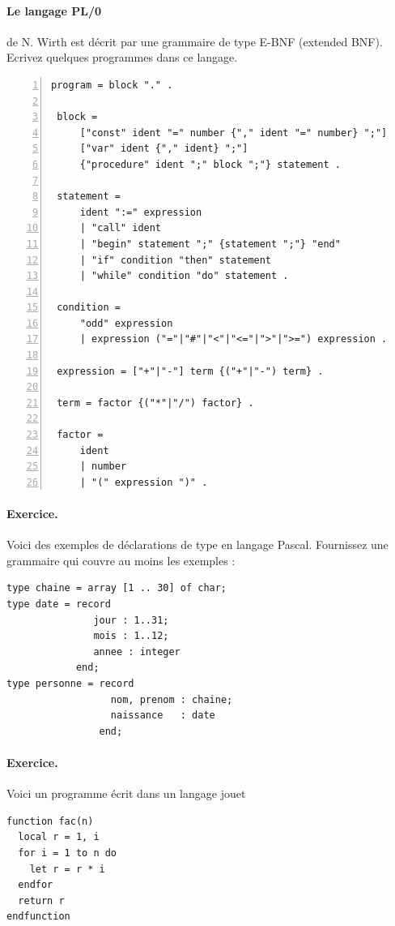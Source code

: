 \documentclass[twoside,11pt]{article}
\begin{document}
\paragraph{Le langage PL/0} de N. Wirth est décrit par une grammaire
de type E-BNF (extended BNF). Ecrivez quelques programmes dans ce langage.
{\small
\begin{lstlisting}[frame=single,numbers=left]
 program = block "." .
 
 block =
     ["const" ident "=" number {"," ident "=" number} ";"]
     ["var" ident {"," ident} ";"]
     {"procedure" ident ";" block ";"} statement .
 
 statement =
     ident ":=" expression
     | "call" ident
     | "begin" statement ";" {statement ";"} "end"
     | "if" condition "then" statement
     | "while" condition "do" statement .
 
 condition =
     "odd" expression
     | expression ("="|"#"|"<"|"<="|">"|">=") expression .
 
 expression = ["+"|"-"] term {("+"|"-") term} .
 
 term = factor {("*"|"/") factor} .

 factor =
     ident
     | number
     | "(" expression ")" .

\end{lstlisting}

\paragraph{Exercice.} Voici des exemples de déclarations de type en 
langage Pascal. Fournissez une grammaire qui couvre au moins
les exemples :

\begin{verbatim}
type chaine = array [1 .. 30] of char;
type date = record 
               jour : 1..31;
               mois : 1..12;
               annee : integer
            end;
type personne = record
                  nom, prenom : chaine;
                  naissance   : date
                end;
\end{verbatim}

                   
\paragraph{Exercice. } Voici un programme écrit dans un langage jouet
\begin{verbatim}
function fac(n)
  local r = 1, i
  for i = 1 to n do
    let r = r * i
  endfor
  return r
endfunction


\end{verbatim}}
\end{document}
